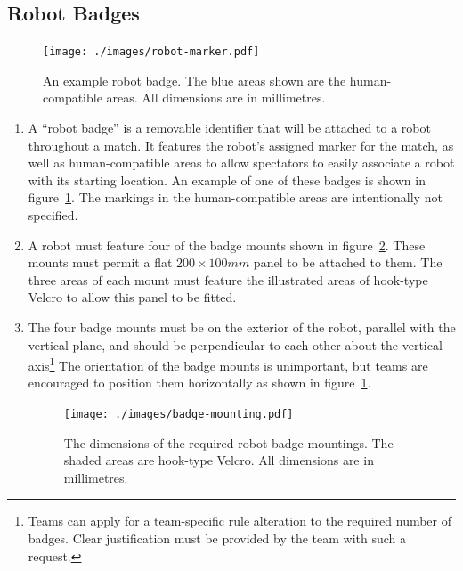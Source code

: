\subsection{Robot Badges}
\label{sec:robot-badges}

\begin{figure}
  \centering
  \texttt{[image: ./images/robot-marker.pdf]}
  \caption{An example robot badge.
           The blue areas shown are the human-compatible areas.
	   All dimensions are in millimetres.}
  \label{fig:example-badge}
\end{figure}

\begin{enumerate}
\item A ``robot badge'' is a removable identifier that will be attached to a robot throughout a match.
      It features the robot's assigned marker for the match, as well as human-compatible areas to allow spectators to easily associate a robot with its starting location.
      An example of one of these badges is shown in figure~\ref{fig:example-badge}.
      The markings in the human-compatible areas are intentionally not specified.

\item A robot must feature four of the badge mounts shown in figure~\ref{fig:badge-mounting}.
      These mounts must permit a flat $200 \times 100mm$ panel to be attached to them.
      The three areas of each mount must feature the illustrated areas of hook-type Velcro to allow this panel to be fitted.

\item The four badge mounts must be on the exterior of the robot, parallel with the vertical plane, and should be perpendicular to each other about the vertical axis\footnote{Teams can apply for a team-specific rule alteration to the required number of badges.
      Clear justification must be provided by the team with such a request.}
      The orientation of the badge mounts is unimportant, but teams are encouraged to position them horizontally as shown in figure~\ref{fig:example-badge}.

\begin{figure}
  \centering
  \texttt{[image: ./images/badge-mounting.pdf]}
  \caption{The dimensions of the required robot badge mountings.
           The shaded areas are hook-type Velcro.
           All dimensions are in millimetres.}
  \label{fig:badge-mounting}
\end{figure}

\end{enumerate}

